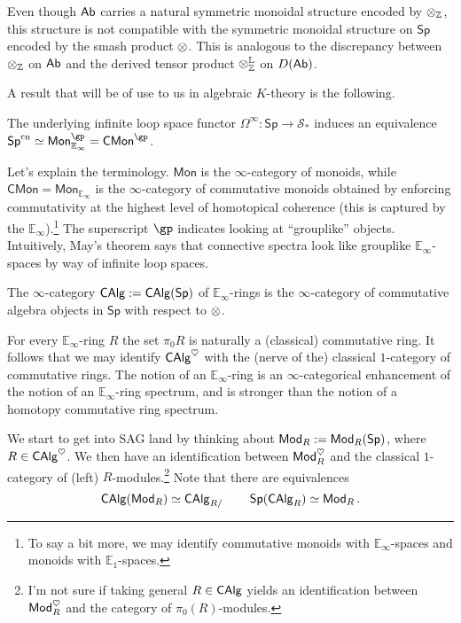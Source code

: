 \documentclass[11pt]{article}
\newcommand{\E}{\mathbb{E}}
\renewcommand{\L}{\mathbb{L}}
\renewcommand{\S}{\mathcal{S}}
\DeclareMathOperator{\cn}{cn} %
\newcommand{\CMon}{\mathsf{CMon}} %
\newcommand{\Mon}{\mathsf{Mon}} %
\renewcommand{\Sp}{\mathsf{Sp}} %
\begin{document}
\begin{remark}
Even though $\operatorname{\mathsf{Ab}}$ carries a natural symmetric monoidal structure encoded by $\otimes_{\mathbb{Z}}$, this structure is not compatible with the symmetric monoidal structure on $\Sp$ encoded by the smash product $\otimes$. This is analogous to the discrepancy between $\otimes_{\mathbb{Z}}$ on $\operatorname{\mathsf{Ab}}$ and the derived tensor product $\tensor_{\Z}^{\L}$ on $D(\operatorname{\mathsf{Ab}})$.
\end{remark}

A result that will be of use to us in algebraic $K$-theory is the following.

\begin{theorem}[May]
The underlying infinite loop space functor $\Omega^{\infty}: \Sp\to\S_*$ induces an equivalence $\Sp^{\cn}\simeq\Mon_{\E_{\infty}}^{\gp}=\CMon^{\gp}$.
\end{theorem}

Let's explain the terminology. $\Mon$ is the $\infty$-category of monoids, while $\CMon=\Mon_{\E_{\infty}}$ is the $\infty$-category of commutative monoids obtained by enforcing commutativity at the highest level of homotopical coherence (this is captured by the $\E_{\infty}$).\footnote{To say a bit more, we may identify commutative monoids with $\E_{\infty}$-spaces and monoids with $\E_1$-spaces.} The superscript $\gp$ indicates looking at ``grouplike'' objects. Intuitively, May's theorem says that connective spectra look like grouplike $\E_{\infty}$-spaces by way of infinite loop spaces. 

\begin{definition}
The $\infty$-category $\CAlg:=\CAlg(\Sp)$ of $\E_{\infty}$-rings is the $\infty$-category of commutative algebra objects in $\Sp$ with respect to $\otimes$.
\end{definition}

For every $\E_{\infty}$-ring $R$ the set $\pi_0R$ is naturally a (classical) commutative ring. It follows that we may identify $\operatorname{\mathsf{CAlg}}^{\heartsuit}$ with the (nerve of the) classical $1$-category of commutative rings. The notion of an $\E_{\infty}$-ring is an $\infty$-categorical enhancement of the notion of an $\E_{\infty}$-ring spectrum, and is stronger than the notion of a homotopy commutative ring spectrum.

\begin{remark}
We start to get into SAG land by thinking about $\Mod_R:=\Mod_R(\Sp)$, where $R\in\operatorname{\mathsf{CAlg}}^{\heartsuit}$. We then have an identification between $\operatorname{\mathsf{Mod}}_R^{\heartsuit}$ and the classical $1$-category of (left) $R$-modules.\footnote{I'm not sure if taking general $R\in\operatorname{\mathsf{CAlg}}$ yields an identification between $\operatorname{\mathsf{Mod}}_R^{\heartsuit}$ and the category of $\pi_0(R)$-modules.} Note that there are equivalences 
$$\CAlg(\Mod_R)\simeq\CAlg_{R/}\qquad \Sp(\CAlg_R)\simeq\Mod_R.$$
\end{remark}
\end{document}
